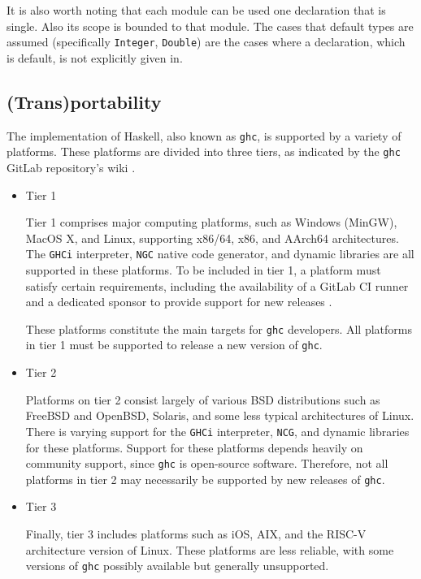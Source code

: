 \documentclass[a4paper, titlepage, twoside]{article}
\begin{document}
It is also worth noting that each module can be used one declaration that is single. Also its scope is bounded to that module. The cases that default types are assumed (specifically \texttt{Integer}, \texttt{Double}) are the cases where a declaration, which is default, is not explicitly given in.

\subsection{(Trans)portability}
\label{sec:org41b7ceb}

The implementation of Haskell, also known as \texttt{ghc}, is supported by a variety of platforms. These platforms are divided into three tiers, as indicated by the \texttt{ghc} GitLab repository's wiki \autocite{gamariPlatformsGlasgowHaskell2023}.

\begin{itemize}
\item Tier 1

Tier 1 comprises major computing platforms, such as Windows (MinGW), MacOS X, and Linux, supporting x86/64, x86, and AArch64 architectures. The \texttt{GHCi} interpreter, \texttt{NGC} native code generator, and dynamic libraries are all supported in these platforms. To be included in tier 1, a platform must satisfy certain requirements, including the availability of a GitLab CI runner and a dedicated sponsor to provide support for new releases \autocite{gamariPlatformsGlasgowHaskell2023}.

These platforms constitute the main targets for \texttt{ghc} developers. All platforms in tier 1 must be supported to release a new version of \texttt{ghc}.

\item Tier 2

Platforms on tier 2 consist largely of various BSD distributions such as FreeBSD and OpenBSD, Solaris, and some less typical architectures of Linux. There is varying support for the \texttt{GHCi} interpreter, \texttt{NCG}, and dynamic libraries for these platforms. Support for these platforms depends heavily on community support, since \texttt{ghc} is open-source software. Therefore, not all platforms in tier 2 may necessarily be supported by new releases of \texttt{ghc}.

\item Tier 3

Finally, tier 3 includes platforms such as iOS, AIX, and the RISC-V architecture version of Linux. These platforms are less reliable, with some versions of \texttt{ghc} possibly available but generally unsupported.
\end{itemize}
\end{document}
